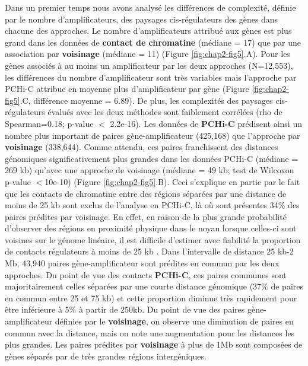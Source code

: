 Dans un premier temps nous avons analysé les différences de complexité, définie par le nombre d’amplificateurs, des paysages \gls{cis}-régulateurs des gènes dans chacune des approches. Le nombre d’amplificateurs attribué aux gènes est plus grand dans les données de \textbf{contact de chromatine} (médiane = 17) que par une association par \textbf{voisinage} (médiane = 11) (Figure \ref{fig:chap2-fig5}.A). Pour les gènes associés à au moins un amplificateur par les deux approches (N=12,553), les différences du nombre d’amplificateur sont très variables mais l’approche par \gls{PCHi-C} attribue en moyenne plus d’amplificateur par gène (Figure \ref{fig:chap2-fig5}.C, différence moyenne = 6.89). De plus, les complexités des paysages \gls{cis}-régulateurs évalués avec les deux méthodes sont faiblement corrélées (rho de Spearman=0.18; p-value $<$ 2.2e-16). Les données de \textbf{\gls{PCHi-C}} prédisent ainsi un nombre plus important de paires gène-amplificateur (425,168) que l’approche par \textbf{voisinage} (338,644). Comme attendu, ces paires franchissent des distances génomiques significativement plus grandes dans les données \gls{PCHi-C} (médiane = 269 kb) qu’avec une approche de voisinage (médiane = 49 kb; test de Wilcoxon p-value $<$10e-10) (Figure \ref{fig:chap2-fig5}.B). Ceci s’explique en partie par le fait que les contacts de chromatine entre des régions séparées par une distance de moins de 25 kb sont exclus de l’analyse en \gls{PCHi-C}, là où sont présentes 34\% des paires prédites par voisinage. En effet, en raison de la plus grande probabilité d’observer des régions en proximité physique dans le noyau lorsque celles-ci sont voisines sur le génome linéaire, il est difficile d’estimer avec fiabilité la proportion de contacts régulateurs à moins de 25 kb \citep{cairns_chicago_2016}. Dans l’intervalle de distance 25 kb-2 Mb, 43,940 paires gène-amplificateur sont prédites en commun par les deux approches. Du point de vue des contacts \textbf{\gls{PCHi-C}}, ces paires communes sont majoritairement celles séparées par une courte distance génomique (37\% de paires en commun entre 25 et 75 kb) et cette proportion diminue très rapidement pour être inférieure à 5\% à partir de 250kb. Du point de vue des paires gène-amplificateur définies par le \textbf{voisinage}, on observe une diminution de paires en commun avec la distance, mais on note une augmentation pour les distances les plus grandes. Les paires prédites par \textbf{voisinage} à plus de 1Mb sont composées de gènes séparés par de très grandes régions intergéniques.\\

